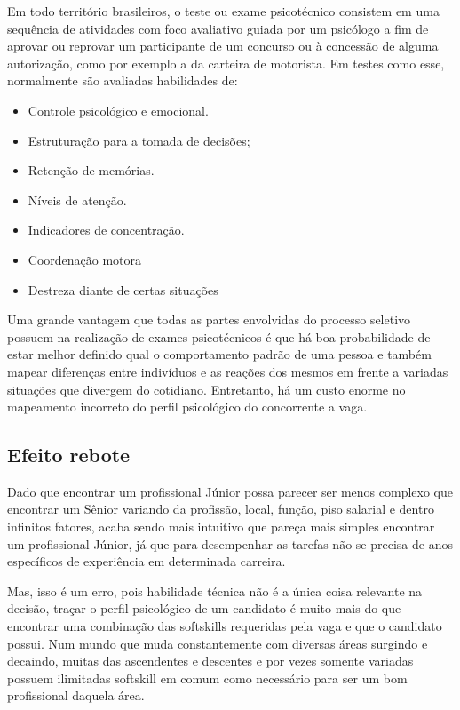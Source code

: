 \documentclass[12pt]{article}
\begin{document}
Em todo território brasileiros, o teste ou exame psicotécnico consistem em uma sequência de atividades com foco avaliativo guiada por um psicólogo a fim de aprovar ou reprovar um participante de um concurso ou à concessão de alguma autorização, como por exemplo a da carteira de motorista. Em testes como esse, normalmente são avaliadas habilidades de:


\begin{itemize}
	\item Controle psicológico e emocional.
	\item Estruturação para a tomada de decisões;
	\item Retenção de memórias.
	\item Níveis de atenção.
	\item Indicadores de concentração.
	\item Coordenação motora
	\item Destreza diante de certas situações
\end{itemize}

\newpage

Uma grande vantagem que todas as partes envolvidas do processo seletivo possuem na realização de exames psicotécnicos é que há boa probabilidade de estar melhor definido qual o comportamento padrão de uma pessoa e também mapear diferenças entre indivíduos e as reações dos mesmos em frente a variadas situações que divergem do cotidiano. Entretanto, há um custo enorme no mapeamento incorreto do perfil psicológico do concorrente a vaga.

\subsection{Efeito rebote}

Dado que encontrar um profissional Júnior possa parecer ser menos complexo que encontrar um Sênior variando da profissão, local, função, piso salarial e dentro infinitos fatores, acaba sendo mais intuitivo que pareça mais simples encontrar um profissional Júnior, já que para desempenhar as tarefas não se precisa de anos específicos de experiência em determinada carreira.

Mas, isso é um erro, pois habilidade técnica não é a única coisa relevante na decisão, traçar o perfil psicológico de um candidato é muito mais do que encontrar uma combinação das softskills requeridas pela vaga e que o candidato possui. Num mundo que muda constantemente com diversas áreas surgindo e decaindo, muitas das ascendentes e descentes e por vezes somente variadas possuem ilimitadas softskill em comum como necessário para ser um bom profissional daquela área.
\end{document}
